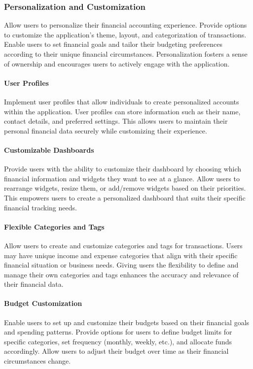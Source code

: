 \subsubsection{Personalization and Customization}
Allow users to personalize their financial accounting experience. Provide options to customize the application's 
theme, layout, and categorization of transactions. Enable users to set financial goals and tailor their budgeting 
preferences according to their unique financial circumstances. Personalization fosters a sense of ownership and 
encourages users to actively engage with the application.

\paragraph{User Profiles}
Implement user profiles that allow individuals to create personalized accounts within the application. User 
profiles can store information such as their name, contact details, and preferred settings. This allows users 
to maintain their personal financial data securely while customizing their experience.

\paragraph{Customizable Dashboards}
Provide users with the ability to customize their dashboard by choosing which financial information and widgets they 
want to see at a glance. Allow users to rearrange widgets, resize them, or add/remove widgets based on their 
priorities. This empowers users to create a personalized dashboard that suits their specific financial tracking needs.

\paragraph{Flexible Categories and Tags}
Allow users to create and customize categories and tags for transactions. Users may have unique income and expense 
categories that align with their specific financial situation or business needs. Giving users the flexibility to 
define and manage their own categories and tags enhances the accuracy and relevance of their financial data.

\paragraph{Budget Customization}
Enable users to set up and customize their budgets based on their financial goals and spending patterns. Provide 
options for users to define budget limits for specific categories, set frequency (monthly, weekly, etc.), and 
allocate funds accordingly. Allow users to adjust their budget over time as their financial circumstances change.


